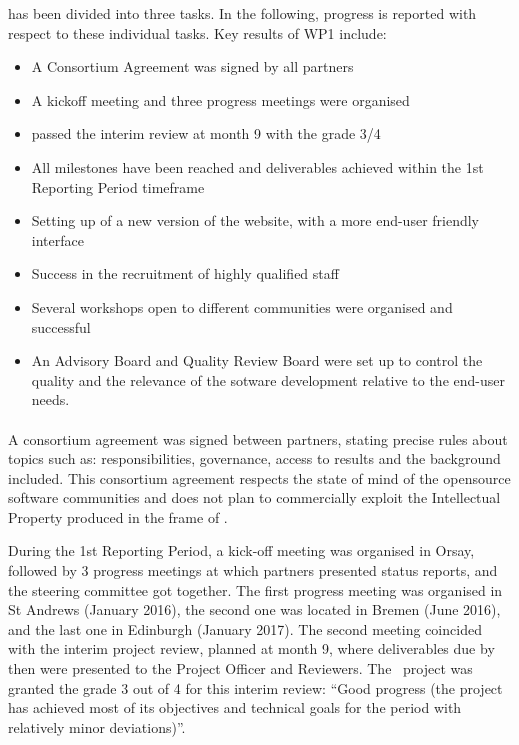 \documentclass{deliverablereport}
\begin{document}
 has been divided into three tasks. In the following, progress is reported with respect to these individual tasks.
Key results of WP1 include:

\begin{itemize}
\item{A Consortium Agreement was signed by all partners}
\item{A kickoff meeting and three progress meetings were organised}
\item{\ODK passed the interim review at month 9 with the grade 3/4}
\item{All milestones have been reached and deliverables achieved within the 1st Reporting Period timeframe}
\item{Setting up of a new version of the \ODK website, with a more end-user friendly interface}
\item{Success in the recruitment of highly qualified staff}
\item{Several workshops open to different communities were organised and successful}
\item{An Advisory Board and Quality Review Board were set up to control the quality and the relevance of the sotware development relative to the end-user needs.}
\end{itemize}

\paragraph{}

A consortium agreement was signed
between partners, stating precise rules about topics such as:
responsibilities, governance, access to results and the background
included.  This consortium agreement respects the state of mind of the opensource software communities and does not plan to commercially exploit the Intellectual Property produced in the frame of \ODK.

During the 1st Reporting Period, a kick-off meeting was organised in Orsay, followed by
3 progress meetings at which partners presented status reports, and
the steering committee got together.  The first progress meeting was
organised in St Andrews (January 2016), the second one was located
in Bremen (June 2016), and the last one in Edinburgh (January 2017). The second meeting coincided with the interim project
review, planned at month 9, where deliverables due by then were
presented to the Project Officer and Reviewers. The \ODK\ project was
granted the grade 3 out of 4 for this interim review: ``Good progress
(the project has achieved most of its objectives and technical goals
for the period with relatively minor deviations)''.
\end{document}

